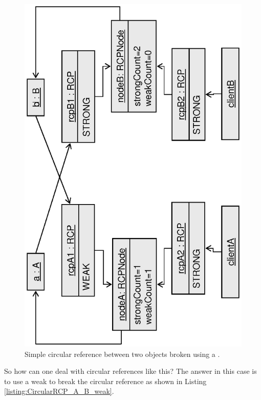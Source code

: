 \documentclass[pdf,ps2pdf,11pt]{SANDreport}
\begin{document}
{\bsinglespace
\begin{figure}
\begin{center}
\includegraphics*[angle=270,scale=0.65]{CircularRCP_A_B_weak}
\end{center}
\caption{
\label{fig:CircularRCP_A_B_weak}
Simple circular reference between two objects broken using a
{} {}.  }
\end{figure}
\esinglespace}

So how can one deal with circular references like this?  The answer in
this case is to use a weak {} to break the circular reference
as shown in Listing {}\ref{listing:CircularRCP_A_B_weak}.
\end{document}
